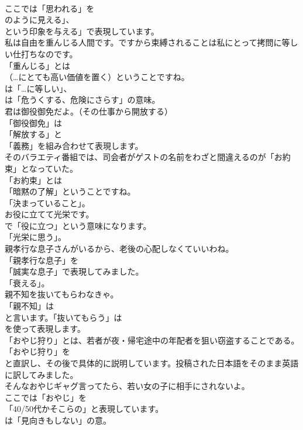 \documentclass[8pt]{extreport}
\begin{document}
\begin{CJK}{UTF8}{min}
\\	ここでは「思われる」を
\\	のように見える」、
\\	という印象を与える」で表現しています。	
\\	私は自由を重んじる人間です。ですから束縛されることは私にとって拷問に等しい仕打ちなのです。 
\\	「重んじる」とは
\\	（…にとても高い価値を置く）ということですね。
\\	は「…に等しい」、
\\	は「危うくする、危険にさらす」の意味。	
\\	君は御役御免だよ。（その仕事から開放する） 
\\	「御役御免」は
\\	「解放する」と
\\	「義務」を組み合わせて表現します。	
\\	そのバラエティ番組では、司会者がゲストの名前をわざと間違えるのが「お約束」となっていた。 
\\	「お約束」とは
\\	「暗黙の了解」ということですね。
\\	「決まっていること」。	
\\	お役に立てて光栄です。 
\\	で「役に立つ」という意味になります。
\\	「光栄に思う」。	
\\	親孝行な息子さんがいるから、老後の心配しなくていいわね。 
\\	「親孝行な息子」を
\\	「誠実な息子」で表現してみました。
\\	「衰える」。	
\\	親不知を抜いてもらわなきゃ。 
\\	「親不知」は
\\	と言います。「抜いてもらう」は
\\	を使って表現します。	
\\	「おやじ狩り」とは、若者が夜・帰宅途中の年配者を狙い窃盗することである。 
\\	「おやじ狩り」を
\\	と直訳し、その後で具体的に説明しています。投稿された日本語をそのまま英語に訳してみました。	
\\	そんなおやじギャグ言ってたら、若い女の子に相手にされないよ。 
\\	ここでは「おやじ」を
\\	「40/50代かそこらの」と表現しています。
\\	は「見向きもしない」の意。	

\end{CJK}
\end{document}
